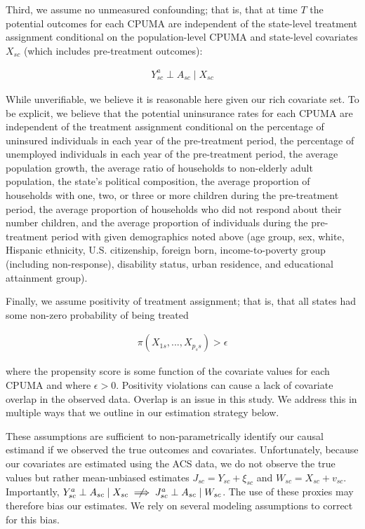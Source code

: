\documentclass[aoas]{imsart}
\theoremstyle{plain}
\theoremstyle{remark}
\begin{document}
Third, we assume no unmeasured confounding; that is, that at time $T$ the potential outcomes for each CPUMA are independent of the state-level treatment assignment conditional on the population-level CPUMA and state-level covariates $X_{sc}$ (which includes pre-treatment outcomes):

\begin{align*}
Y_{sc}^a \perp A_{sc} \mid X_{sc}
\end{align*}

While unverifiable, we believe it is reasonable here given our rich covariate set. To be explicit, we believe that the potential uninsurance rates for each CPUMA are independent of the treatment assignment conditional on the percentage of uninsured individuals in each year of the pre-treatment period, the percentage of unemployed individuals in each year of the pre-treatment period, the average population growth, the average ratio of households to non-elderly adult population, the state's political composition, the average proportion of households with one, two, or three or more children during the pre-treatment period, the average proportion of households who did not respond about their number children, and the average proportion of individuals during the pre-treatment period with given demographics noted above (age group, sex, white, Hispanic ethnicity, U.S. citizenship, foreign born, income-to-poverty group (including non-response), disability status, urban residence, and educational attainment group). 

Finally, we assume positivity of treatment assignment; that is, that all states had some non-zero probability of being treated 

\begin{align*}
\pi(X_{1s}, ..., X_{p_ss}) > \epsilon
\end{align*}

where the propensity score is some function of the covariate values for each CPUMA and where $\epsilon > 0$. Positivity violations can cause a lack of covariate overlap in the observed data. Overlap is an issue in this study. We address this in multiple ways that we outline in our estimation strategy below. 

These assumptions are sufficient to non-parametrically identify our causal estimand if we observed the true outcomes and covariates. Unfortunately, because our covariates are estimated using the ACS data, we do not observe the true values but rather mean-unbiased estimates $J_{sc} = Y_{sc} + \xi_{sc}$ and $W_{sc} = X_{sc} + v_{sc}$. Importantly, $Y_{sc}^a \perp A_{sc} \mid X_{sc} \centernot\implies J_{sc}^a \perp A_{sc} \mid W_{sc}$. The use of these proxies may therefore bias our estimates. We rely on several modeling assumptions to correct for this bias.
\end{document}
